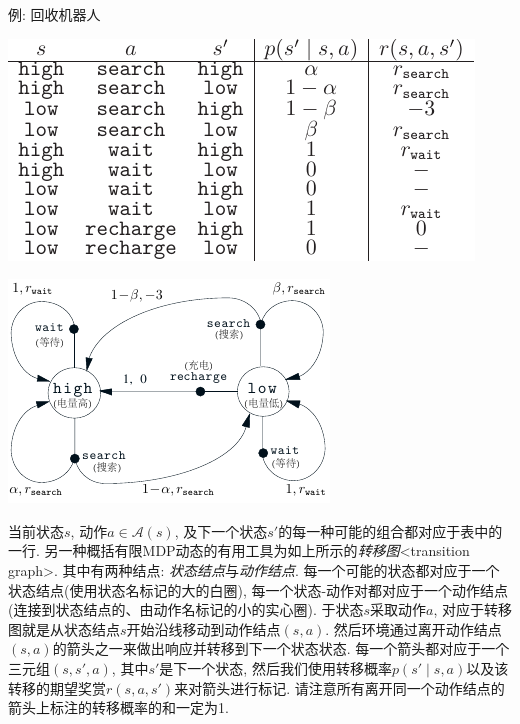 \begin{mathbox}{例\theexamcnt: 回收机器人}
\begin{center}
\begin{minipage}[c]{.5\textwidth}
\includegraphics[width=\textwidth]{c3/img/dynamics_table.pdf}
\end{minipage}
\quad
\begin{minipage}[c]{.45\textwidth}
\includegraphics[width=\textwidth]{c3/img/mdp.pdf}
\end{minipage}
\end{center}
\vspace{.5em}

当前状态$s$, 动作$a \in \mathcal{A}(s)$, 及下一个状态$s'$的每一种可能的组合都对应于表中的一行. 另一种概括有限MDP动态的有用工具为如上所示的\emph{转移图}<transition graph>. 其中有两种结点: \emph{状态结点}与\emph{动作结点}. 每一个可能的状态都对应于一个状态结点(使用状态名标记的大的白圈), 每一个状态-动作对都对应于一个动作结点(连接到状态结点的、由动作名标记的小的实心圈). 于状态$s$采取动作$a$, 对应于转移图就是从状态结点$s$开始沿线移动到动作结点$(s, a)$. 然后环境通过离开动作结点$(s, a)$的箭头之一来做出响应并转移到下一个状态状态. 每一个箭头都对应于一个三元组$(s, s', a)$, 其中$s'$是下一个状态, 然后我们使用转移概率$p(s' \mid s, a)$以及该转移的期望奖赏$r(s, a, s')$来对箭头进行标记. 请注意所有离开同一个动作结点的箭头上标注的转移概率的和一定为1.
\end{mathbox}

